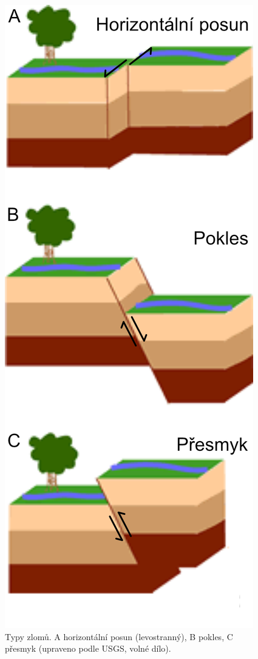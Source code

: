 \begin{figure}[h]
	\centering
	\includegraphics[width=0.8\linewidth]{obrazky/tectonic/zlomy}
	\caption{Typy zlomů. A horizontální posun (levostranný), B pokles, C přesmyk (upraveno podle USGS, volné dílo).}	
	\label{fig:zlomy}
\end{figure}

